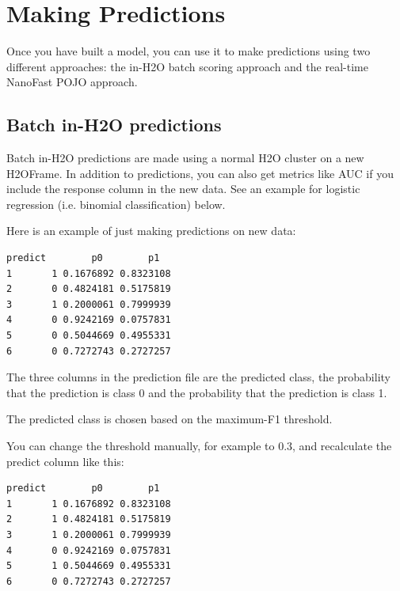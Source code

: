 
\section{Making Predictions}

Once you have built a model, you can use it to make predictions using two different approaches:  the in-H2O batch
scoring approach and the real-time NanoFast POJO approach.

\subsection{Batch in-H2O predictions}

Batch in-H2O predictions are made using a normal H2O cluster on a new H2OFrame.  In addition to predictions, you
can also get metrics like AUC if you include the response column in the new data.  See an example for logistic
regression (i.e. binomial classification) below.

\bigskip
\waterExampleInR



Here is an example of just making predictions on new data:


\begin{lstlisting}[style=output]
  predict        p0        p1
1       1 0.1676892 0.8323108
2       0 0.4824181 0.5175819
3       1 0.2000061 0.7999939
4       0 0.9242169 0.0757831
5       0 0.5044669 0.4955331
6       0 0.7272743 0.2727257
\end{lstlisting}

The three columns in the prediction file are the predicted class, the probability that the prediction is class 0
and the probability that the prediction is class 1.

The predicted class is chosen based on the maximum-F1 threshold.

You can change the threshold manually, for example to 0.3, and recalculate the predict column like this:


\begin{lstlisting}[style=output]
  predict        p0        p1
1       1 0.1676892 0.8323108
2       1 0.4824181 0.5175819
3       1 0.2000061 0.7999939
4       0 0.9242169 0.0757831
5       1 0.5044669 0.4955331
6       0 0.7272743 0.2727257
\end{lstlisting}

